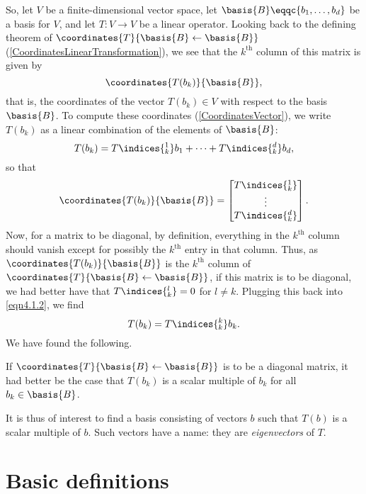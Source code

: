 So, let $V$ be a finite-dimensional vector space, let $\basis{B}\eqqc \{ b_1,\ldots ,b_d\}$ be a basis for $V$, and let $T\colon V\rightarrow V$ be a linear operator.  Looking back to the defining theorem of $\coordinates{T}{\basis{B}\leftarrow \basis{B}}$ (\cref{CoordinatesLinearTransformation}), we see that the $k^{\text{th}}$ column of this matrix is given by
\begin{equation}
	\coordinates{T(b_k)}{\basis{B}},
\end{equation}
that is, the coordinates of the vector $T(b_k)\in V$ with respect to the basis $\basis{B}$.  To compute these coordinates (\cref{CoordinatesVector}), we write $T(b_k)$ as a linear combination of the elements of $\basis{B}$:
\begin{equation}\label{eqn4.1.2}
	T(b_k)=T\indices{^1_k}b_1+\cdots +T\indices{^d_k}b_d,
\end{equation}
so that
\begin{equation}
	\coordinates{T(b_k)}{\basis{B}}=\begin{bmatrix}T\indices{^1_k} \\ \vdots \\ T\indices{^d_k}\end{bmatrix}.
\end{equation}
Now, for a matrix to be diagonal, by definition, everything in the $k^{\text{th}}$ column should vanish except for possibly the $k^{\text{th}}$ entry in that column.  Thus, as $\coordinates{T(b_k)}{\basis{B}}$ is the $k^{\text{th}}$ column of $\coordinates{T}{\basis{B}\leftarrow \basis{B}}$, if this matrix is to be diagonal, we had better have that $T\indices{^l_k}=0$ for $l\neq k$.  Plugging this back into \eqref{eqn4.1.2}, we find
\begin{equation}
	T(b_k)=T\indices{^k_k}b_k.
\end{equation}
We have found the following.
\begin{displayquote}
	If $\coordinates{T}{\basis{B}\leftarrow \basis{B}}$ is to be a diagonal matrix, it had better be the case that $T(b_k)$ is a scalar multiple of $b_k$ for all $b_k\in \basis{B}$.
\end{displayquote}

It is thus of interest to find a basis consisting of vectors $b$ such that $T(b)$ is a scalar multiple of $b$.  Such vectors have a name:  they are \emph{eigenvectors} of $T$.

\section{Basic definitions}

